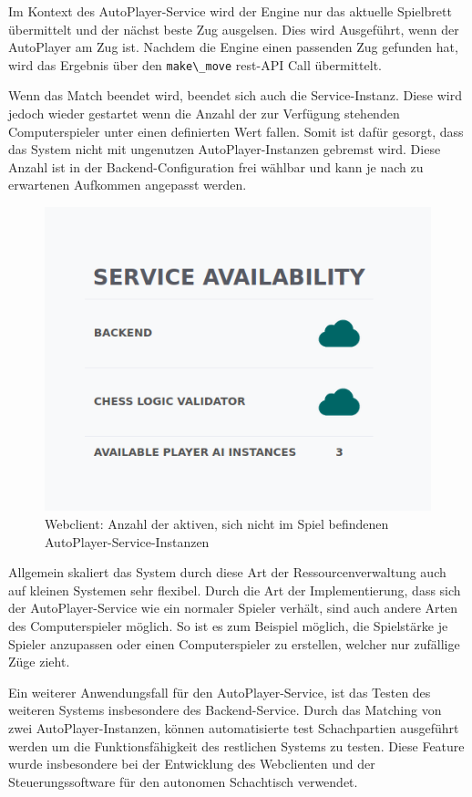 Im Kontext des AutoPlayer-Service wird der Engine nur das aktuelle
Spielbrett übermittelt und der nächst beste Zug ausgelsen. Dies wird
Ausgeführt, wenn der AutoPlayer am Zug ist. Nachdem die Engine einen
passenden Zug gefunden hat, wird das Ergebnis über den
\passthrough{\lstinline!make\_move!} \gls{rest}-API Call übermittelt.

Wenn das Match beendet wird, beendet sich auch die Service-Instanz.
Diese wird jedoch wieder gestartet wenn die Anzahl der zur Verfügung
stehenden Computerspieler unter einen definierten Wert fallen. Somit ist
dafür gesorgt, dass das System nicht mit ungenutzen AutoPlayer-Instanzen
gebremst wird. Diese Anzahl ist in der Backend-Configuration frei
wählbar und kann je nach zu erwartenen Aufkommen angepasst werden.

\begin{figure}
\centering
\includegraphics{images/ai_player_count.png}
\caption{Webclient: Anzahl der aktiven, sich nicht im Spiel befindenen
AutoPlayer-Service-Instanzen}
\end{figure}

Allgemein skaliert das System durch diese Art der Ressourcenverwaltung
auch auf kleinen Systemen sehr flexibel. Durch die Art der
Implementierung, dass sich der AutoPlayer-Service wie ein normaler
Spieler verhält, sind auch andere Arten des Computerspieler möglich. So
ist es zum Beispiel möglich, die Spielstärke je Spieler anzupassen oder
einen Computerspieler zu erstellen, welcher nur zufällige Züge zieht.

Ein weiterer Anwendungsfall für den AutoPlayer-Service, ist das Testen
des weiteren Systems insbesondere des Backend-Service. Durch das
Matching von zwei AutoPlayer-Instanzen, können automatisierte test
Schachpartien ausgeführt werden um die Funktionsfähigkeit des restlichen
Systems zu testen. Diese Feature wurde insbesondere bei der Entwicklung
des Webclienten und der Steuerungssoftware für den autonomen Schachtisch
verwendet.

